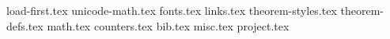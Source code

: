 
{load-first.tex}
{unicode-math.tex}
{fonts.tex}
{links.tex}
{theorem-styles.tex}
{theorem-defs.tex}
{math.tex}
{counters.tex}
{bib.tex}
{misc.tex}
{project.tex}
